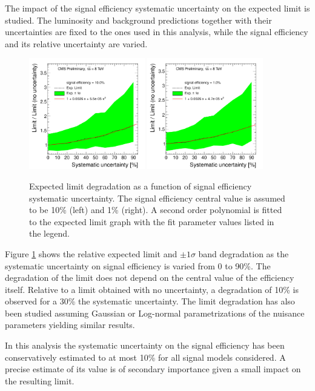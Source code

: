 
The impact of the signal efficiency systematic uncertainty on the expected limit is studied. 
The luminosity and background predictions together with their uncertainties are fixed to the ones used 
in this analysis, while the signal efficiency and its relative uncertainty are varied.


\begin{figure}[htbp]
\centering
\includegraphics[width=0.45\textwidth]{plots/degradation/10percent.pdf}
\includegraphics[width=0.45\textwidth]{plots/degradation/1percent.pdf}
\caption{Expected limit degradation as a function of signal efficiency systematic uncertainty.
The signal efficiency central value is assumed to be 10\% (left) and 1\% (right). A second order polynomial
is fitted to the expected limit graph with the fit parameter values listed in the legend.\label{fig:degradation}}
\end{figure}

Figure \ref{fig:degradation} shows the relative expected limit and $\pm1\sigma$ band degradation as the 
systematic uncertainty on signal efficiency is varied from 0 to 90\%. The degradation of the limit does not depend
on the central value of the efficiency itself. Relative to a limit obtained with no uncertainty, a 
degradation of 10\% is observed for a 30\% the systematic uncertainty. The limit degradation has also been studied 
assuming Gaussian or Log-normal parametrizations of the nuisance parameters yielding similar results.

In this analysis the systematic uncertainty on the signal efficiency has been conservatively 
estimated to at most 10\% for all signal models considered. A precise estimate of its value is of secondary importance given a small impact on the resulting limit.
      

